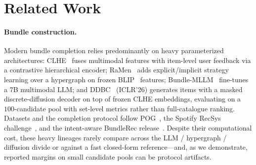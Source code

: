 \section{Related Work}
\label{sec:related}

\paragraph{Bundle construction.}
Modern bundle completion relies predominantly on heavy parameterized architectures: CLHE~\cite{clhe} fuses
multimodal features with item-level user feedback via a contrastive hierarchical encoder; RaMen~\cite{ramen}
adds explicit/implicit strategy learning over a hypergraph on frozen BLIP~\cite{blip} features;
Bundle-MLLM~\cite{bundlemllm} fine-tunes a 7B multimodal LLM; and DDBC~\cite{ddbc} (ICLR'26) generates items
with a masked discrete-diffusion decoder on top of frozen CLHE embeddings, evaluating on a $100$-candidate pool
with set-level metrics rather than full-catalogue ranking. Datasets and the completion protocol follow
POG~\cite{pog}, the Spotify RecSys challenge~\cite{spotify}, and the intent-aware BundleRec
release~\cite{bundlerec}. Despite their computational cost, these heavy lineages rarely compare across the
LLM / hypergraph / diffusion divide or against a fast closed-form reference---and, as we demonstrate, reported
margins on small candidate pools can be protocol artifacts.

